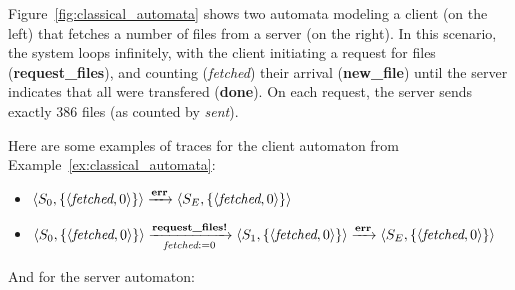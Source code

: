 \begin{example}
\label{ex:classical_automata}
Figure~\ref{fig:classical_automata} shows two automata modeling a client (on
the left) that fetches a number of files from a server (on the right).  In this
scenario, the system loops infinitely, with the client initiating a request for
files (\textbf{request\_files}), and counting (\textit{fetched}) their arrival
(\textbf{new\_file}) until the server indicates that all were transfered
(\textbf{done}). On each request, the server sends exactly 386 files (as
counted by \textit{sent}).
\end{example}

\begin{example}[Traces]
Here are some examples of traces for the client automaton from
Example~\ref{ex:classical_automata}:
\begin{itemize}
\item
   $
   \langle S_0, \{\langle \textit{fetched}, 0 \rangle\}\rangle \allowbreak{}
   \automatatransitiontrace{\textbf{err}}{} \allowbreak{}
   \langle S_E, \{\langle \textit{fetched}, 0 \rangle\}\rangle
   $
\item
   $
   \langle S_0, \{\langle \textit{fetched}, 0 \rangle\}\rangle \allowbreak{}
   \automatatransitiontrace{\textbf{request\_files!}}{\textit{fetched} := 0} \allowbreak{}
   \langle S_1, \{\langle \textit{fetched}, 0 \rangle\}\rangle \allowbreak{}
   \automatatransitiontrace{\textbf{err}}{} \allowbreak{}
   \langle S_E, \{\langle \textit{fetched}, 0 \rangle\}\rangle
   $
\end{itemize}
And for the server automaton:
\end{example}

